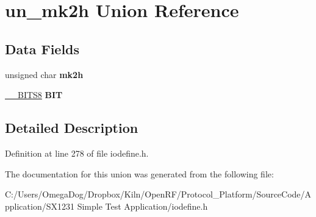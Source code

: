 \hypertarget{unionun__mk2h}{\section{un\-\_\-mk2h Union Reference}
\label{unionun__mk2h}
}
\subsection*{Data Fields}
\begin{DoxyCompactItemize}
\item 
\hypertarget{unionun__mk2h_ac639f1c4793aad21271421b6054cb527}{unsigned char {\bfseries mk2h}}\label{unionun__mk2h_ac639f1c4793aad21271421b6054cb527}

\item 
\hypertarget{unionun__mk2h_a873de3f32dd4e13915b3c03a37a5b5b9}{\hyperlink{struct_____b_i_t_s8}{\-\_\-\-\_\-\-B\-I\-T\-S8} {\bfseries B\-I\-T}}\label{unionun__mk2h_a873de3f32dd4e13915b3c03a37a5b5b9}

\end{DoxyCompactItemize}


\subsection{Detailed Description}


Definition at line 278 of file iodefine.\-h.



The documentation for this union was generated from the following file\-:\begin{DoxyCompactItemize}
\item 
C\-:/\-Users/\-Omega\-Dog/\-Dropbox/\-Kiln/\-Open\-R\-F/\-Protocol\-\_\-\-Platform/\-Source\-Code/\-Application/\-S\-X1231 Simple Test Application/iodefine.\-h\end{DoxyCompactItemize}
